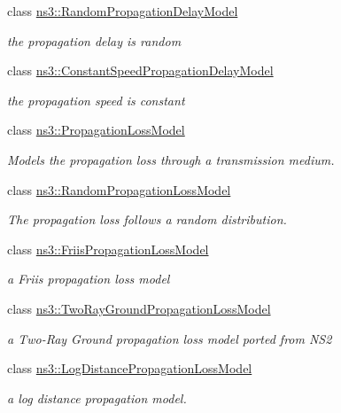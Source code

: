 \begin{DoxyCompactItemize}
class \hyperlink{classns3_1_1RandomPropagationDelayModel}{ns3\+::\+Random\+Propagation\+Delay\+Model}
\begin{DoxyCompactList}\small\item\em the propagation delay is random \end{DoxyCompactList}\item 
class \hyperlink{classns3_1_1ConstantSpeedPropagationDelayModel}{ns3\+::\+Constant\+Speed\+Propagation\+Delay\+Model}
\begin{DoxyCompactList}\small\item\em the propagation speed is constant \end{DoxyCompactList}\item 
class \hyperlink{classns3_1_1PropagationLossModel}{ns3\+::\+Propagation\+Loss\+Model}
\begin{DoxyCompactList}\small\item\em Models the propagation loss through a transmission medium. \end{DoxyCompactList}\item 
class \hyperlink{classns3_1_1RandomPropagationLossModel}{ns3\+::\+Random\+Propagation\+Loss\+Model}
\begin{DoxyCompactList}\small\item\em The propagation loss follows a random distribution. \end{DoxyCompactList}\item 
class \hyperlink{classns3_1_1FriisPropagationLossModel}{ns3\+::\+Friis\+Propagation\+Loss\+Model}
\begin{DoxyCompactList}\small\item\em a Friis propagation loss model \end{DoxyCompactList}\item 
class \hyperlink{classns3_1_1TwoRayGroundPropagationLossModel}{ns3\+::\+Two\+Ray\+Ground\+Propagation\+Loss\+Model}
\begin{DoxyCompactList}\small\item\em a Two-\/\+Ray Ground propagation loss model ported from N\+S2 \end{DoxyCompactList}\item 
class \hyperlink{classns3_1_1LogDistancePropagationLossModel}{ns3\+::\+Log\+Distance\+Propagation\+Loss\+Model}
\begin{DoxyCompactList}\small\item\em a log distance propagation model. \end{DoxyCompactList}\item 

\end{DoxyCompactItemize}
